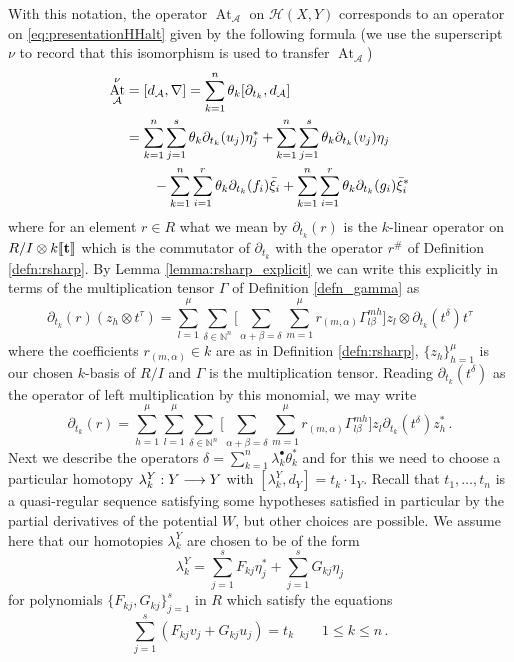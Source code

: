 \documentclass[english,letter paper,12pt,leqno]{article}
\theoremstyle{example}
\numberwithin{equation}{section}
\def\AA{\mathcal{A}}
\def\HH{\HH}
\def\HH{\mathcal{H}}
\def\be{\begin{equation}}
\def\ee{\end{equation}}
\DeclareMathOperator{\vAt}{At}
\begin{document}
With this notation, the operator $\vAt_{\AA}$ on $\HH(X,Y)$ corresponds to an operator on \eqref{eq:presentationHHalt} given by the following formula (we use the superscript $\nu$ to record that this isomorphism is used to transfer $\vAt_{\AA}$) 
\begin{align}
\vAt^{\nu}_{\AA} &= [ d_{\AA}, \nabla ] = \sum_{k=1}^n \theta_k [ \partial_{t_k}, d_{\AA} ]\nonumber\\
&= \sum_{k=1}^n \sum_{j=1}^s \theta_k \partial_{t_k} (u_j) \eta_j^* + \sum_{k=1}^n \sum_{j=1}^s \theta_k \partial_{t_k}( v_j ) \eta_j\label{eq:vat_formula}\\
& \qquad - \sum_{k=1}^n \sum_{i=1}^r \theta_k \partial_{t_k}(f_i) \Bar{\xi}_i + \sum_{k=1}^n \sum_{i=1}^r \theta_k \partial_{t_k}(g_i) \Bar{\xi}_i^*\nonumber
\end{align}
where for an element $r \in R$ what we mean by $\partial_{t_k}(r)$ is the $k$-linear operator on $R/I \otimes k\llbracket \bold{t} \rrbracket$ which is the commutator of $\partial_{t_k}$ with the operator $r^{\#}$ of Definition \ref{defn:rsharp}. By Lemma \ref{lemma:rsharp_explicit} we can write this explicitly in terms of the multiplication tensor $\Gamma$ of Definition \ref{defn_gamma} as
\be
\partial_{t_k}(r)(z_h \otimes t^{\tau}) = \sum_{l=1}^\mu \sum_{\delta \in \mathbb{N}^n} \Big[ \sum_{\alpha + \beta = \delta } \sum_{m=1}^\mu r_{(m,\alpha)} \Gamma^{mh}_{l\beta} \Big] z_l \otimes \partial_{t_k}(t^\delta) t^{\tau}
\ee
where the coefficients $r_{(m,\alpha)} \in k$ are as in Definition \ref{defn:rsharp}, $\{ z_h \}_{h=1}^\mu$ is our chosen $k$-basis of $R/I$ and $\Gamma$ is the multiplication tensor. Reading $\partial_{t_k}(t^\delta)$ as the operator of left multiplication by this monomial, we may write
\be\label{eq:partial_derivative_op}
\partial_{t_k}(r) = \sum_{h=1}^\mu \sum_{l=1}^\mu \sum_{\delta \in \mathbb{N}^n} \Big[ \sum_{\alpha + \beta = \delta } \sum_{m=1}^\mu r_{(m,\alpha)} \Gamma^{mh}_{l\beta} \Big] z_l \partial_{t_k}(t^\delta) z_h^*\,.
\ee
Next we describe the operators $\delta = \sum_{k=1}^n \lambda^\bullet_k \theta_k^*$ and for this we need to choose a particular homotopy $\lambda^Y_k: Y \longrightarrow Y$ with $[ \lambda^Y_k, d_Y ] = t_k \cdot 1_Y$. Recall that $t_1,\ldots,t_n$ is a quasi-regular sequence satisfying some hypotheses satisfied in particular by the partial derivatives of the potential $W$, but other choices are possible. We assume here that our homotopies $\lambda^Y_k$ are chosen to be of the form
\be\label{eq:formula_lambdak_koszul}
\lambda^Y_k = \sum_{j=1}^s F_{kj} \eta_j^* + \sum_{j=1}^s G_{kj} \eta_j
\ee
for polynomials $\{ F_{kj}, G_{kj} \}_{j=1}^s$ in $R$ which satisfy the equations
\[
\sum_{j=1}^s( F_{kj} v_j + G_{kj} u_j ) = t_k \qquad 1 \le k \le n\,.
\]
\end{document}
